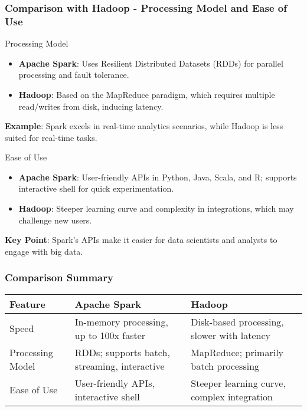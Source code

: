 \documentclass{beamer}
\begin{document}
\begin{frame}[fragile]
    \frametitle{Comparison with Hadoop - Processing Model and Ease of Use}
    \begin{block}{Processing Model}
        \begin{itemize}
            \item \textbf{Apache Spark}: Uses Resilient Distributed Datasets (RDDs) for parallel processing and fault tolerance.
            \item \textbf{Hadoop}: Based on the MapReduce paradigm, which requires multiple read/writes from disk, inducing latency.
        \end{itemize}
        \textbf{Example}: Spark excels in real-time analytics scenarios, while Hadoop is less suited for real-time tasks.
    \end{block}

    \begin{block}{Ease of Use}
        \begin{itemize}
            \item \textbf{Apache Spark}: User-friendly APIs in Python, Java, Scala, and R; supports interactive shell for quick experimentation.
            \item \textbf{Hadoop}: Steeper learning curve and complexity in integrations, which may challenge new users.
        \end{itemize}
        \textbf{Key Point}: Spark's APIs make it easier for data scientists and analysts to engage with big data.
    \end{block}
\end{frame}

\begin{frame}[fragile]
    \frametitle{Comparison Summary}
    \begin{table}[]
        \centering
        \begin{tabular}{|l|l|l|}
            \hline
            \textbf{Feature} & \textbf{Apache Spark}                         & \textbf{Hadoop}                            \\ \hline
            Speed            & In-memory processing, up to 100x faster      & Disk-based processing, slower with latency \\ \hline
            Processing Model & RDDs; supports batch, streaming, interactive  & MapReduce; primarily batch processing      \\ \hline
            Ease of Use      & User-friendly APIs, interactive shell        & Steeper learning curve, complex integration \\ \hline
        \end{tabular}
    \end{table}
\end{frame}
\end{document}
